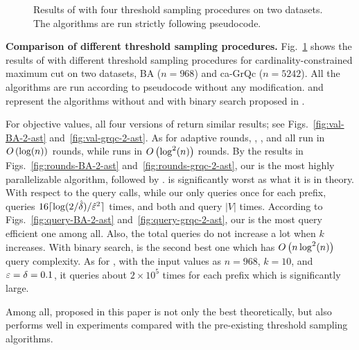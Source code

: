 \begin{figure}[t]
{  }
  \caption{Results of \atg with four threshold sampling procedures on two datasets. 
  The algorithms are run strictly following pseudocode.
   } \label{fig:main2}
\end{figure}

\textbf{Comparison of different threshold sampling procedures.} 
Fig.~\ref{fig:main2} shows the results of \atg 
with different threshold sampling procedures for cardinality-constrained maximum cut 
on two datasets, BA ($n=968$) and ca-GrQc ($n = 5242$).
All the algorithms are run according to pseudocode without any modification.
\threseqama and \tsbin represent the \threseq algorithms without and with
binary search proposed in .

For objective values, all four versions of \atg return similar results;
see Figs.~\ref{fig:val-BA-2-ast} and~\ref{fig:val-grqc-2-ast}.
As for adaptive rounds, \threseq, \thresam, and \threseqama all run in
$O\left( \log(n) \right)$ rounds, while \tsbin runs in $O\left( \log^2(n) \right)$ rounds.
By the results in Figs.~\ref{fig:rounds-BA-2-ast} and~\ref{fig:rounds-grqc-2-ast},
our \threseq is the most highly parallelizable algorithm, followed by \threseqama.
\tsbin is significantly worst as what it is in theory.
With respect to the query calls,
while our \threseq only queries once for each prefix,
\thresam queries $16\lceil \log(2/\hat{\delta})/\hat{\varepsilon}^2 \rceil$ times,
and both \threseqama and \tsbin query $|V|$ times.
According to Figs.~\ref{fig:query-BA-2-ast} and~\ref{fig:query-grqc-2-ast},
our \threseq is the most query efficient one among all.
Also, the total queries do not increase a lot when $k$ increases.
With binary search, \tsbin is the second best one which has $O\left( n\log^2(n) \right)$
query complexity.
As for \thresam,
with the input values as $n=968$, $k=10$, and $\varepsilon = \delta = 0.1$,
it queries about $2\times 10^5$ times for each prefix
which is significantly large.

Among all, \threseq proposed in this paper is not only the best theoretically,
but also performs well in experiments compared with
the pre-existing threshold sampling algorithms.

